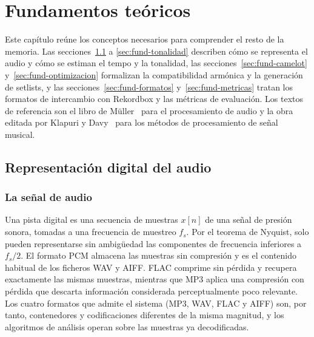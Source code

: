 
\chapter{Fundamentos teóricos}
\label{cha:fundamentos}

Este capítulo reúne los conceptos necesarios para comprender el resto de la memoria. Las secciones~\ref{sec:fund-audio} a \ref{sec:fund-tonalidad} describen cómo se representa el audio y cómo se estiman el tempo y la tonalidad, las secciones~\ref{sec:fund-camelot} y~\ref{sec:fund-optimizacion} formalizan la compatibilidad armónica y la generación de setlists, y las secciones~\ref{sec:fund-formatos} y~\ref{sec:fund-metricas} tratan los formatos de intercambio con Rekordbox y las métricas de evaluación. Los textos de referencia son el libro de Müller~\cite{muller2021fundamentals} para el procesamiento de audio y la obra editada por Klapuri y Davy~\cite{klapuri2006signal} para los métodos de procesamiento de señal musical.

\section{Representación digital del audio}
\label{sec:fund-audio}

\subsection{La señal de audio}

Una pista digital es una secuencia de muestras $x[n]$ de una señal de presión sonora, tomadas a una frecuencia de muestreo $f_s$. Por el teorema de Nyquist, solo pueden representarse sin ambigüedad las componentes de frecuencia inferiores a $f_s/2$. El formato PCM almacena las muestras sin compresión y es el contenido habitual de los ficheros WAV y AIFF. FLAC comprime sin pérdida y recupera exactamente las mismas muestras, mientras que MP3 aplica una compresión con pérdida que descarta información considerada perceptualmente poco relevante. Los cuatro formatos que admite el sistema (MP3, WAV, FLAC y AIFF) son, por tanto, contenedores y codificaciones diferentes de la misma magnitud, y los algoritmos de análisis operan sobre las muestras ya decodificadas.

